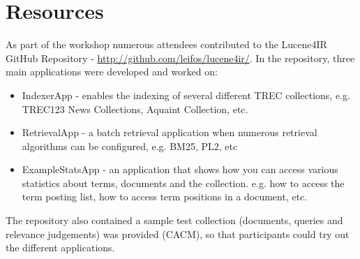\section{Resources}
As part of the workshop numerous attendees contributed to the Lucene4IR GitHub Repository - \url{http://github.com/leifos/lucene4ir/}. In the repository, three main applications were developed and worked on:
\begin{itemize}
	\item IndexerApp - enables the indexing of several different TREC collections, e.g. TREC123 News Collections, Aquaint Collection, etc.
	\item RetrievalApp - a batch retrieval application when numerous retrieval algorithms can be configured, e.g. BM25, PL2, etc
	\item ExampleStatsApp - an application that shows how you can access various statistics about terms, documents and the collection. e.g. how to access the term posting list, how to access term positions in a document, etc.
	\end{itemize}

The repository also contained a sample test collection (documents, queries and relevance judgements) was provided (CACM), so that participants could try out the different applications.

